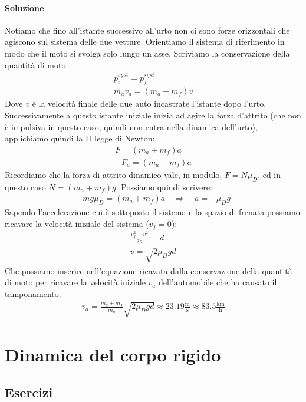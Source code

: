 \documentclass[12pt,a4paper]{book}
\begin{document}
\subsubsection*{Soluzione}
Notiamo che fino all'istante successivo all'urto non ci sono forze orizzontali che agiscono sul sistema delle due vetture. Orientiamo il sistema di riferimento in modo che il moto si svolga solo lungo un asse. Scriviamo la conservazione della quantità di moto:
%
\begin{gather*}
p_i^{syst}=p_f^{syst} \\
m_av_a=(m_a+m_f)v
\end{gather*}
%
Dove $v$ è la velocità finale delle due auto incastrate l'istante dopo l'urto. Successivamente a questo istante iniziale inizia ad agire la forza d'attrito (che non è impulsiva in questo caso, quindi non entra nella dinamica dell'urto), applichiamo quindi la II legge di Newton:
%
\begin{gather*}
F=(m_a+m_f)a \\
-F_a=(m_a+m_f)a
\end{gather*}
%
Ricordiamo che la forza di attrito dinamico vale, in modulo, $F=N\mu_D$, ed in questo caso $N=(m_a+m_f)g$. Possiamo quindi scrivere:
%
\begin{gather*}
-mg\mu_D=(m_a+m_f)a \quad	\Longrightarrow \quad a=-\mu_Dg
\end{gather*}
%
Sapendo l'accelerazione cui è sottoposto il sistema e lo spazio di frenata possiamo ricavare la velocità iniziale del sistema ($v_f=0$):
%
\begin{gather*}
\frac{v_f^2-v^2}{2a}=d \\
v=\sqrt{2\mu_Dgd}
\end{gather*}
%
Che possiamo inserire nell'equazione ricavata dalla conservazione della quantità di moto per ricavare la velocità iniziale $v_a$ dell'automobile che ha causato il tamponamento:
%
\begin{gather*}
v_a=\frac{m_a+m_f}{m_a}\sqrt{2\mu_Dgd} \approx 23.19 \frac{\text{m}}{\text{s}} \approx 83.5 \frac{\text{km}}{\text{h}}
\end{gather*}
%


\graphicspath{{./figure/5/}}

\chapter{Dinamica del corpo rigido}
\section{Esercizi}
\end{document}
